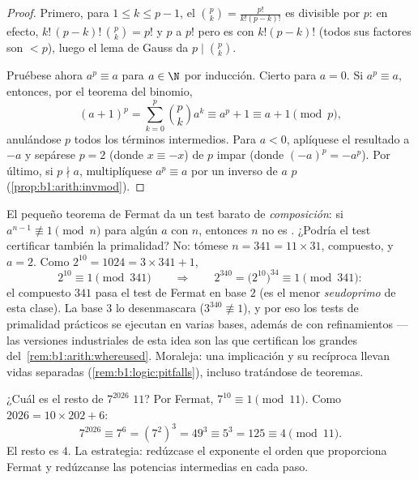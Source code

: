 \begin{proof}
Primero, para $1 \leq k \leq p - 1$, el 
$\binom pk = \frac{p!}{k!(p-k)!}$ es divisible por $p$: en efecto,
$k!\,(p-k)!\,\binom pk = p!$ y $p$  a $p!$ pero es  con
$k!(p-k)!$ (todos sus factores son $< p$), luego el lema de Gauss da
$p \mid \binom pk$.

Pruébese ahora $a^p \equiv a$ para $a \in \N$ por inducción. Cierto
para $a = 0$. Si $a^p \equiv a$, entonces, por el teorema del binomio,
\[
(a+1)^p = \sum_{k=0}^{p} \binom pk a^k
\equiv a^p + 1 \equiv a + 1 \pmod p,
\]
anulándose  $p$ todos los términos intermedios. Para $a < 0$,
aplíquese el resultado a $-a$ y sepárese $p = 2$ (donde $x \equiv -x$)
de $p$ impar (donde $(-a)^p = -a^p$). Por último, si $p \nmid a$,
multiplíquese $a^p \equiv a$ por un inverso de $a$  $p$
(\cref{prop:b1:arith:invmod}).
\end{proof}

\begin{example}\label{ex:b1:arith:pseudoprime}
El pequeño teorema de Fermat da un test barato de
\emph{composición}: si $a^{n-1} \not\equiv 1 \pmod n$ para algún $a$
 con $n$, entonces $n$ no es . ¿Podría el test
certificar también la primalidad? No: tómese $n = 341 = 11 \times 31$,
compuesto, y $a = 2$. Como $2^{10} = 1024 = 3 \times 341 + 1$,
\[
2^{10} \equiv 1 \pmod{341}
\qquad\Longrightarrow\qquad
2^{340} = \bigl(2^{10}\bigr)^{34} \equiv 1 \pmod{341} :
\]
el compuesto $341$ pasa el test de Fermat en base $2$ (es el menor
\emph{seudoprimo} de esta clase). La base $3$ lo desenmascara
($3^{340} \not\equiv 1$), y por eso los tests de primalidad prácticos
se ejecutan en varias bases, además de con refinamientos --- las
versiones industriales de esta idea son las que certifican los grandes
 del~\cref{rem:b1:arith:whereused}. Moraleja: una implicación
y su recíproca llevan vidas separadas
(\cref{rem:b1:logic:pitfalls}), incluso tratándose de teoremas.
\end{example}

\begin{example}\label{ex:b1:arith:congruences}
¿Cuál es el resto de $7^{2026}$  $11$? Por Fermat,
$7^{10} \equiv 1 \pmod{11}$. Como $2026 = 10 \times 202 + 6$:
\[
7^{2026} \equiv 7^6 = (7^2)^3 = 49^3 \equiv 5^3 = 125 \equiv 4
\pmod{11}.
\]
El resto es $4$. La estrategia: redúzcase el exponente  el orden
que proporciona Fermat y redúzcanse las potencias intermedias en cada
paso.
\end{example}

